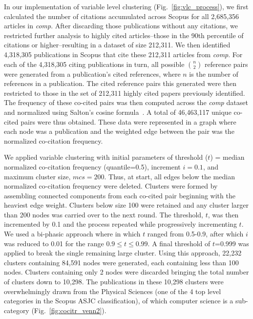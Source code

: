 In our implementation of variable level clustering (Fig.~\ref{fig:vlc_process}), we first calculated the number of citations accumulated across Scopus for all 2,685,356 articles in \emph{comp}. After discarding those publications without any citations, we restricted further analysis to highly cited articles--those in the 90th percentile of citations or higher--resulting in a dataset of size 212,311. We then identified 4,318,305 publications in Scopus that cite these 212,311 articles from \emph{comp}. For each of the 4,318,305 citing publications in turn, all possible ${n \choose 2}$ reference pairs were generated from a publication's cited references, where $n$ is the number of references in a publication. The cited reference pairs this generated were then restricted to those in the set of 212,311 highly cited papers previously identified. The frequency of these co-cited pairs was then computed across the \emph{comp} dataset  and normalized using Salton's cosine formula~\cite{salton_citation_1979}. A total of 46,463,117 unique co-cited pairs were thus obtained. These data were represented in a graph where each node was a publication and the weighted edge between the pair was the normalized co-citation frequency. \par

We applied variable clustering with initial parameters of threshold ($t$) = median normalized co-citation frequency (quantile=0.5), increment $i = 0.1$, and maximum cluster size, $mcs=200$. Thus, at start, all edges below the median normalized co-citation frequency were deleted. Clusters were formed by assembling connected components from each co-cited pair beginning with the heaviest edge weight. Clusters below size 100 were retained and any cluster larger than 200 nodes was carried over to the next round. The threshold, $t$, was then incremented by 0.1 and the process repeated while progressively incrementing $t$.  We used a bi-phasic approach where in which $t$ ranged from 0.5-0.9, after which $i$ was reduced to 0.01 for the range $0.9 \leq t \leq 0.99$. A final threshold of $t$=0.999 was applied to break the single remaining large cluster.  Using this approach, 22,232 clusters containing 84,591 nodes were generated, each containing less than 100 nodes. Clusters containing only 2 nodes were discarded bringing the total number of clusters down to 10,298. The publications in these 10,298 clusters were overwhelmingly drawn from the Physical Sciences (one of the 4 top level categories in the Scopus ASJC classification), of which computer science is a sub-category (Fig.~\ref{fig:cocitr_venn2}).

